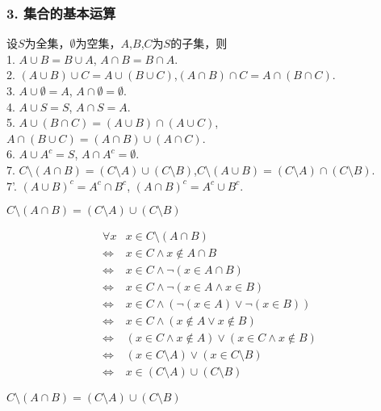 \documentclass{beamer}
\begin{document}
\begin{CJK*}{UTF8}{gbsn}
\begin{frame}
  \frametitle{3. 集合的基本运算}
  \begin{Thm3.1}
设$S$为全集，$\emptyset$为空集，$A$,$B$,$C$为$S$的子集，则\\
1. $A \cup B = B \cup A$, $A \cap B = B \cap A$.\\
2. $(A \cup B) \cup C = A \cup (B \cup C)$,$(A \cap B) \cap C = A \cap (B \cap C)$.\\
3. $A \cup \emptyset = A$, $A \cap \emptyset = \emptyset$.\\
4. $A \cup S = S$, $A \cap S = A$.\\
5. $A \cup (B \cap C) = (A \cup B) \cap (A \cup C)$, $A \cap (B \cup C) = (A \cap B) \cup (A \cap C)$.\\
6. $A \cup A^c = S$, $A \cap A^c = \emptyset$.\\
7. $C \setminus (A \cap B) = (C \setminus A) \cup (C \setminus B)$,$C\setminus (A \cup B) = (C \setminus A) \cap (C \setminus B)$.\\ 
7'. $(A \cup B)^c = A^c \cap B^c$, $(A \cap B)^c = A^c \cup B^c$.\\
  \end{Thm3.1}
\end{frame}

\begin{frame}
  $C \setminus (A \cap B) = (C \setminus A) \cup (C \setminus B)$

  \begin{equation*}
    \begin{split}
      \forall x &x \in C\setminus (A\cap B)\\
      \Leftrightarrow&x \in C \land x \notin A\cap B\\
      \Leftrightarrow&x \in C \land \lnot (x \in A\cap B)\\
      \Leftrightarrow&x \in C \land \lnot (x \in A \land x \in B)\\
      \Leftrightarrow&x \in C \land (\lnot (x \in A) \lor \lnot (x \in B))\\
      \Leftrightarrow&x \in C \land (x \notin A \lor x \notin B)\\
      \Leftrightarrow&(x \in C \land x \notin A) \lor (x \in C \land x \notin B)\\
      \Leftrightarrow&(x \in C\setminus A)\lor (x\in C\setminus B)\\
      \Leftrightarrow&x \in (C\setminus A) \cup (C \setminus B)
    \end{split}
  \end{equation*}
\end{frame}
\begin{frame}
  $C \setminus (A \cap B) = (C \setminus A) \cup (C \setminus B)$


\end{frame}
\end{CJK*}
\end{document}
